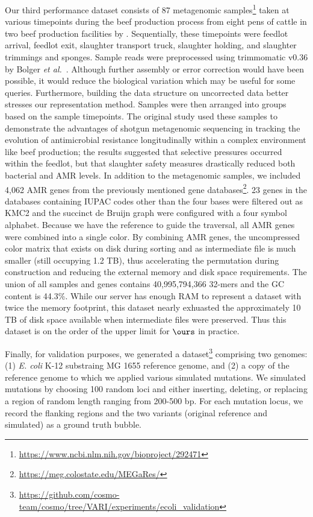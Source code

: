 \documentclass[doctor]{thesis}
\begin{document}
Our third performance dataset consists of 87 metagenomic samples\footnote{\url{https://www.ncbi.nlm.nih.gov/bioproject/292471}} taken at various timepoints during the beef production process from eight pens of cattle in two beef production facilities by \cite{noyes2016resistome}.  Sequentially, these timepoints were feedlot arrival, feedlot exit, slaughter transport truck, slaughter holding, and slaughter trimmings and sponges.  Sample reads were preprocessed using trimmomatic v0.36 by Bolger {\it et al.}~\citep{bolger2014trimmomatic}.  Although further assembly or error correction would have been possible, it would reduce the biological variation which may be useful for some queries.  Furthermore, building the data structure on uncorrected data better stresses our representation method.  Samples were then arranged into groups based on the sample timepoints. The original study used these samples to demonstrate the advantages of shotgun metagenomic sequencing in tracking the evolution of antimicrobial resistance longitudinally within a complex environment like beef production; the results suggested that selective pressures occurred within the feedlot, but that slaughter safety measures drastically reduced both bacterial and AMR levels.  In addition to the metagenomic samples, we included 4,062 AMR genes from the previously mentioned gene databases\footnote{\url{https://meg.colostate.edu/MEGaRes/}}.  23 genes in the databases containing IUPAC codes other than the four bases were filtered out as KMC2 and the succinct de Bruijn graph were configured with a four symbol alphabet.  Because we have the reference to guide the traversal, all AMR genes were combined into a single color.  By combining AMR genes, the uncompressed color matrix that exists on disk during sorting and as intermediate file is much smaller (still occupying 1.2 TB), thus accelerating the permutation during construction and reducing the external memory and disk space requirements.  The union of all samples and genes contains 40,995,794,366 32-mers and the GC content is 44.3\%.  While our server has enough RAM to represent a dataset with twice the memory footprint, this dataset nearly exhuasted the approximately 10 TB of disk space available when intermediate files were preserved.  Thus this dataset is on the order of the upper limit for $\ours$ in practice.

Finally, for validation purposes, we generated a dataset\footnote{\url{https://github.com/cosmo-team/cosmo/tree/VARI/experiments/ecoli_validation}} comprising two genomes: (1) \emph{E. coli} K-12 substraing MG 1655 reference genome, and (2) a copy of the reference genome to which we applied various simulated mutations.  We simulated mutations by choosing 100 random loci and either inserting, deleting, or replacing a region of random length ranging from 200-500 bp.  For each mutation locus, we record the flanking regions and the two variants (original reference and simulated) as a ground truth bubble.  
\end{document}
